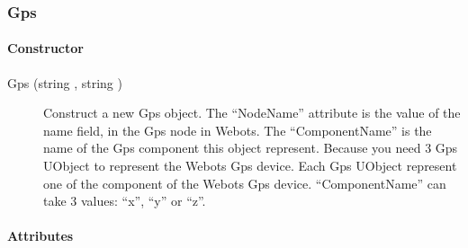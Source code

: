 \subsubsection{Gps}

\paragraph{Constructor}

\noindent
\begin{description}
\item[{Gps (string , string )}]
  Construct a new Gps object.  The ``NodeName'' attribute is the value
  of the name field, in the Gps node in Webots.  The ``ComponentName''
  is the name of the Gps component this object represent.  Because you
  need 3 Gps UObject to represent the Webots Gps device. Each Gps
  UObject represent one of the component of the Webots Gps device.
  ``ComponentName'' can take 3 values: ``x'', ``y'' or ``z''.
\end{description}

\paragraph{Attributes}

